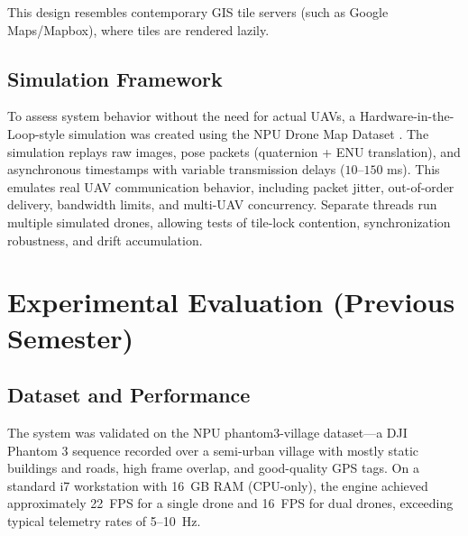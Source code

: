 \documentclass[conference]{IEEEtran}
\begin{document}
This design resembles contemporary GIS tile servers (such as Google Maps/Mapbox), where tiles are rendered lazily.

\subsection{Simulation Framework}
To assess system behavior without the need for actual UAVs, a Hardware-in-the-Loop-style simulation was created using the NPU Drone Map Dataset \cite{npudataset}. The simulation replays raw images, pose packets (quaternion + ENU translation), and asynchronous timestamps with variable transmission delays ($10$--$150$ ms). This emulates real UAV communication behavior, including packet jitter, out-of-order delivery, bandwidth limits, and multi-UAV concurrency. Separate threads run multiple simulated drones, allowing tests of tile-lock contention, synchronization robustness, and drift accumulation.


\section{Experimental Evaluation (Previous Semester)}
\label{sec:results_prev}

\subsection{Dataset and Performance}
The system was validated on the NPU phantom3-village dataset---a DJI Phantom 3 sequence recorded over a semi-urban village with mostly static buildings and roads, high frame overlap, and good-quality GPS tags. On a standard i7 workstation with 16~GB RAM (CPU-only), the engine achieved approximately 22~FPS for a single drone and 16~FPS for dual drones, exceeding typical telemetry rates of 5--10~Hz.

\begin{table}[h]
\centering
\caption{System Throughput Analysis (Previous Semester)}
\label{tab:throughput_prev}
\end{table}
\end{document}
